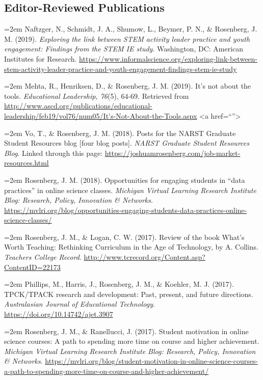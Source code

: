 \documentclass[
  11pt,
]{article}
\begin{document}
\hypertarget{editor-reviewed-publications}{%
\subsection{Editor-Reviewed
Publications}\label{editor-reviewed-publications}}

\hangindent=2em Naftzger, N., Schmidt, J. A., Shumow, L., Beymer, P. N.,
\& Rosenberg, J. M. (2019). \emph{Exploring the link between STEM
activity leader practice and youth engagement: Findings from the STEM IE
study}. Washington, DC: American Institutes for Research.
\url{https://www.informalscience.org/exploring-link-between-stem-activity-leader-practice-and-youth-engagement-findings-stem-ie-study}

\hangindent=2em Mehta, R., Henriksen, D., \& Rosenberg, J. M. (2019).
It's not about the tools. \emph{Educational Leadership, 76}(5), 64-69.
Retrieved from
\url{http://www.ascd.org/publications/educational-leadership/feb19/vol76/num05/It's-Not-About-the-Tools.aspx}
\textless a href=``''\textgreater{}

\hangindent=2em Vo, T., \& Rosenberg, J. M. (2018). Posts for the NARST
Graduate Student Resources blog {[}four blog posts{]}. \emph{NARST
Graduate Student Resources Blog}. Linked through this page:
\url{https://joshuamrosenberg.com/job-market-resources.html}

\hangindent=2em Rosenberg, J. M. (2018). Opportunities for engaging
students in ``data practices'' in online science classes. \emph{Michigan
Virtual Learning Research Institute Blog: Research, Policy, Innovation
\& Networks}.
\url{https://mvlri.org/blog/opportunities-engaging-students-data-practices-online-science-classes/}

\hangindent=2em Rosenberg, J. M., \& Logan, C. W. (2017). Review of the
book What's Worth Teaching: Rethinking Curriculum in the Age of
Technology, by A. Collins. \emph{Teachers College Record}.
\url{http://www.tcrecord.org/Content.asp?ContentID=22173}

\hangindent=2em Phillips, M., Harris, J., Rosenberg, J. M., \& Koehler,
M. J. (2017). TPCK/TPACK research and development: Past, present, and
future directions. \emph{Australasian Journal of Educational
Technology}. \url{https://doi.org/10.14742/ajet.3907}

\hangindent=2em Rosenberg, J. M., \& Ranellucci, J. (2017). Student
motivation in online science courses: A path to spending more time on
course and higher achievement. \emph{Michigan Virtual Learning Research
Institute Blog: Research, Policy, Innovation \& Networks}.
\url{https://mvlri.org/blog/student-motivation-in-online-science-courses-a-path-to-spending-more-time-on-course-and-higher-achievement/}
\end{document}
